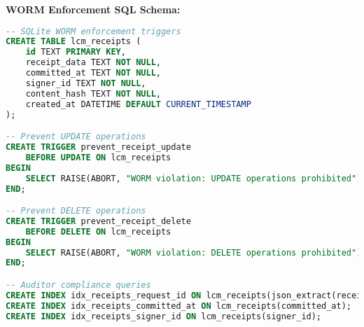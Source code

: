 \documentclass[12pt,a4paper]{article}
\begin{document}
\textbf{WORM Enforcement SQL Schema:}
\begin{lstlisting}[language=SQL, caption=WORM Enforcement SQL Schema]
-- SQLite WORM enforcement triggers
CREATE TABLE lcm_receipts (
    id TEXT PRIMARY KEY,
    receipt_data TEXT NOT NULL,
    committed_at TEXT NOT NULL,
    signer_id TEXT NOT NULL,
    content_hash TEXT NOT NULL,
    created_at DATETIME DEFAULT CURRENT_TIMESTAMP
);

-- Prevent UPDATE operations
CREATE TRIGGER prevent_receipt_update
    BEFORE UPDATE ON lcm_receipts
BEGIN
    SELECT RAISE(ABORT, "WORM violation: UPDATE operations prohibited");
END;

-- Prevent DELETE operations  
CREATE TRIGGER prevent_receipt_delete
    BEFORE DELETE ON lcm_receipts
BEGIN
    SELECT RAISE(ABORT, "WORM violation: DELETE operations prohibited");
END;

-- Auditor compliance queries
CREATE INDEX idx_receipts_request_id ON lcm_receipts(json_extract(receipt_data, "$.request_id"));
CREATE INDEX idx_receipts_committed_at ON lcm_receipts(committed_at);
CREATE INDEX idx_receipts_signer_id ON lcm_receipts(signer_id);
\end{lstlisting}
\end{document}
